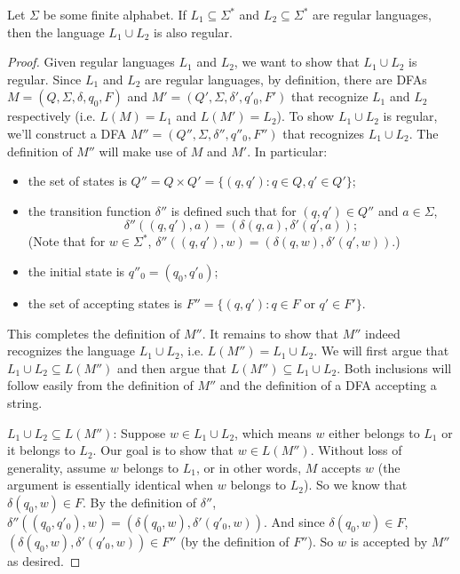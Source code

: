 \begin{flex}
\begin{theorem} \label{theorem:Regular-languages-are-closed-under-union}
Let $\Sigma$ be some finite alphabet. 
If $L_1 \subseteq \Sigma^*$ and $L_2 \subseteq \Sigma^*$ are regular languages, then the language $L_1 \cup L_2$ is also regular.
\end{theorem}

\begin{proof}
Given regular languages $L_1$ and $L_2$, we want to show that $L_1 \cup L_2$ is regular. Since $L_1$ and $L_2$ are regular languages, by definition, there are DFAs $M = (Q, \Sigma, \delta, q_0, F)$ and $M' = (Q', \Sigma, \delta', q'_0, F')$ that recognize $L_1$ and $L_2$ respectively (i.e. $L(M) = L_1$ and $L(M') = L_2$). 
To show $L_1 \cup L_2$ is regular, we'll construct a DFA $M'' = (Q'', \Sigma, \delta'', q''_0, F'')$ that recognizes $L_1 \cup L_2$. 
The definition of $M''$ will make use of $M$ and $M'$. 
In particular:
\begin{itemize}
    \item the set of states is $Q'' = Q \times Q' = \{(q, q') : q \in Q, q' \in Q'\}$;
    \item the transition function $\delta''$ is defined such that for $(q,q') \in Q''$ and $a \in \Sigma$, $$\delta''((q,q'), a) = (\delta(q,a), \delta'(q',a));$$
    (Note that for $w \in \Sigma^*$, $\delta''((q,q'), w) = (\delta(q,w), \delta'(q', w))$.)
    \item the initial state is $q''_0 = (q_0, q'_0)$;
    \item the set of accepting states is $F'' = \{(q, q') : q \in F \text{ or } q' \in F'\}$.
\end{itemize}
This completes the definition of $M''$. 
It remains to show that $M''$ indeed recognizes the language $L_1 \cup L_2$, i.e. $L(M'') = L_1 \cup L_2$. 
We will first argue that $L_1 \cup L_2 \subseteq L(M'')$ and then argue that $L(M'') \subseteq L_1 \cup L_2$. 
Both inclusions will follow easily from the definition of $M''$ and the definition of a DFA accepting a string.

$L_1 \cup L_2 \subseteq L(M'')$: 
Suppose $w \in L_1 \cup L_2$, which means $w$ either belongs to $L_1$ or it belongs to $L_2$. Our goal is to show that $w \in L(M'')$. 
Without loss of generality, assume $w$ belongs to $L_1$, or in other words, $M$ accepts $w$ (the argument is essentially identical when $w$ belongs to $L_2$). 
So we know that $\delta(q_0, w) \in F$. 
By the definition of $\delta''$, $\delta''((q_0, q'_0), w) = (\delta(q_0,w), \delta'(q'_0, w))$. 
And since $\delta(q_0, w) \in F$, $(\delta(q_0,w), \delta'(q'_0, w)) \in F''$ (by the definition of $F''$). 
So $w$ is accepted by $M''$ as desired.


\end{proof}
\end{flex}
